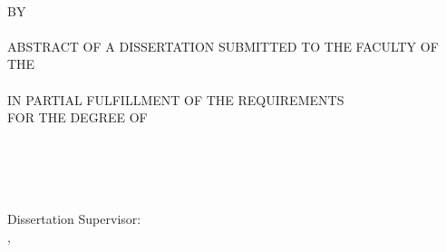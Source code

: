 

\newpage
\begin{singlespace}

\vspace*{0.5in}

\centering
\Large
\MakeUppercase \dissertationtitle \\	
\vspace{1em}
\large{BY}\\
\large{\MakeUppercase \candidatename} \\	
\vspace{2em}
\MakeUppercase{Abstract of a dissertation submitted to the faculty of the} \\
\MakeUppercase \departmentname \\
\MakeUppercase{in partial fulfillment of the requirements} \\
\vspace{1em}
\MakeUppercase{for the degree of} \\
\MakeUppercase \degreetype \\
\MakeUppercase \degreemajor \\
\MakeUppercase \schoolname  \\
\yearofcompletion \\


\vspace{4em}

\small
\raggedright

Dissertation Supervisor: \supervisor\supervisordegree	\\
\supervisorrank, \departmentname


\end{singlespace}
